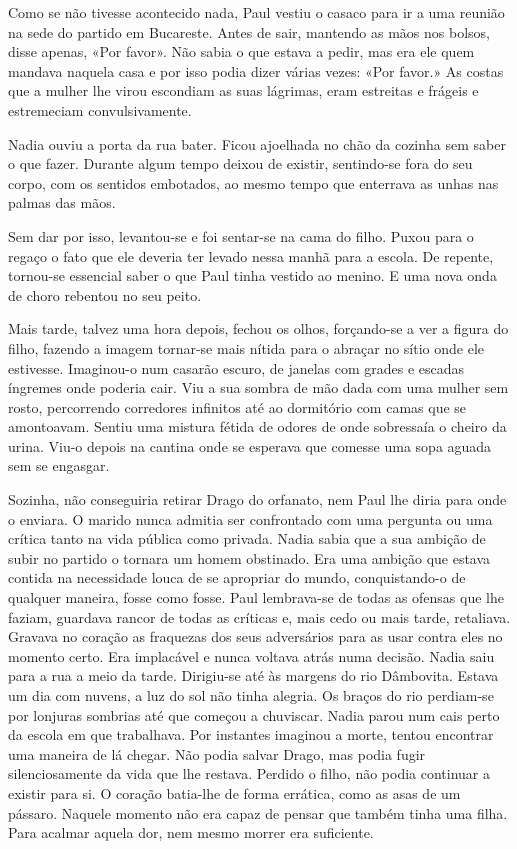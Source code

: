 Como se não tivesse acontecido nada, Paul vestiu o casaco para ir a uma
reunião na sede do partido em Bucareste. Antes de sair, mantendo as
mãos nos bolsos, disse apenas, «Por favor». Não sabia o que estava a
pedir, mas era ele quem mandava naquela casa e por isso podia dizer
várias vezes: «Por favor.» As costas que a mulher lhe virou escondiam as
suas lágrimas, eram estreitas e frágeis e estremeciam convulsivamente.

Nadia ouviu a porta da rua bater. Ficou ajoelhada no chão da cozinha sem
saber o que fazer. Durante algum tempo deixou de existir, sentindo-se
fora do seu corpo, com os sentidos embotados, ao mesmo tempo que enterrava as unhas nas palmas das mãos.

Sem dar por isso, levantou-se e foi sentar-se na cama do filho. Puxou
para o regaço o fato que ele deveria ter levado nessa manhã para a
escola. De repente, tornou-se essencial saber o que Paul tinha vestido
ao menino. E uma nova onda de choro rebentou no seu peito.

Mais tarde, talvez uma hora depois, fechou os olhos, forçando-se a ver a
figura do filho, fazendo a imagem tornar-se mais nítida para o abraçar
no sítio onde ele estivesse. Imaginou-o num casarão escuro, de janelas
com grades e escadas íngremes onde poderia cair. Viu a sua sombra de mão
dada com uma mulher sem rosto, percorrendo corredores infinitos até ao
dormitório com camas que se amontoavam. Sentiu uma mistura fétida de
odores de onde sobressaía o cheiro da urina. Viu-o depois na cantina
onde se esperava que comesse uma sopa aguada sem se engasgar.

Sozinha, não conseguiria retirar Drago do orfanato, nem Paul lhe diria
para onde o enviara. O marido nunca admitia ser confrontado com uma
pergunta ou uma crítica tanto na vida pública como privada. Nadia sabia
que a sua ambição de subir no partido o tornara um homem obstinado. Era
uma ambição que estava contida na necessidade louca de se apropriar do
mundo, conquistando-o de qualquer maneira, fosse como fosse. Paul
lembrava-se de todas as ofensas que lhe faziam, guardava rancor de todas
as críticas e, mais cedo ou mais tarde, retaliava. Gravava no coração as
fraquezas dos seus adversários para as usar contra eles no momento
certo. Era implacável e nunca voltava atrás numa decisão. Nadia saiu
para a rua a meio da tarde. Dirigiu-se até às margens do rio Dâmbovita.
Estava um dia com nuvens, a
luz do sol não tinha alegria. Os braços do rio perdiam-se por lonjuras
sombrias até que começou a chuviscar. Nadia parou num cais perto da
escola em que trabalhava. Por instantes imaginou a morte, tentou
encontrar uma maneira de lá chegar. Não podia salvar Drago, mas podia
fugir silenciosamente da vida que lhe restava. Perdido o filho, não
podia continuar a existir para si. O coração batia-lhe de forma
errática, como as asas de um pássaro. Naquele momento não era capaz de
pensar que também tinha uma filha. Para acalmar aquela dor, nem mesmo
morrer era suficiente.

